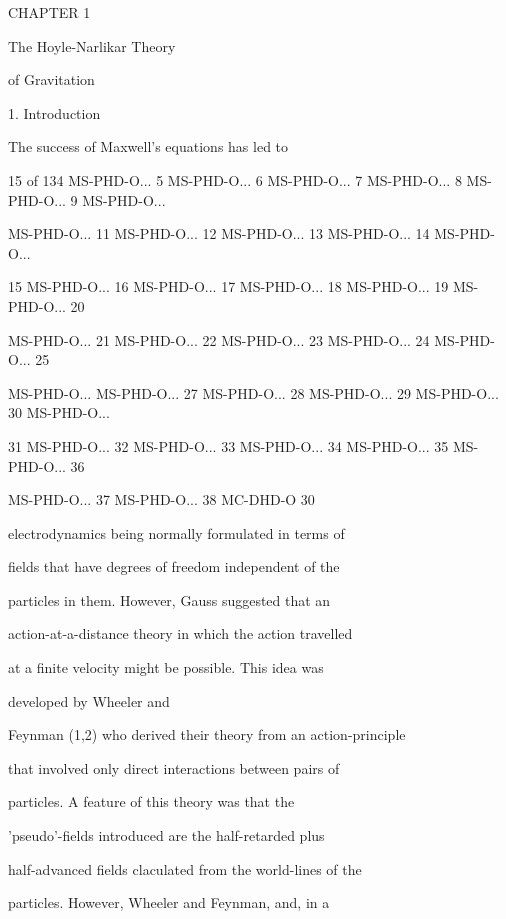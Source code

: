 \documentclass{article}
\begin{document}







CHAPTER 1

The Hoyle-Narlikar Theory

of Gravitation

1. Introduction

The success of Maxwell's equations has led to

15 of 134 MS-PHD-O... 5 MS-PHD-O... 6 MS-PHD-O... 7 MS-PHD-O... 8 MS-PHD-O... 9 MS-PHD-O...

MS-PHD-O... 11 MS-PHD-O... 12 MS-PHD-O... 13 MS-PHD-O... 14 MS-PHD-O...

15 MS-PHD-O... 16 MS-PHD-O... 17 MS-PHD-O... 18 MS-PHD-O... 19 MS-PHD-O... 20

MS-PHD-O... 21 MS-PHD-O... 22 MS-PHD-O... 23 MS-PHD-O... 24 MS-PHD-O... 25

MS-PHD-O... MS-PHD-O... 27 MS-PHD-O... 28 MS-PHD-O... 29 MS-PHD-O... 30 MS-PHD-O...

31 MS-PHD-O... 32 MS-PHD-O... 33 MS-PHD-O... 34 MS-PHD-O... 35 MS-PHD-O... 36

MS-PHD-O... 37 MS-PHD-O... 38 MC-DHD-O 30

electrodynamics being normally formulated in terms of

fields that have degrees of freedom independent of the

particles in them. However, Gauss suggested that an

action-at-a-distance theory in which the action travelled

at a finite velocity might be possible. This idea was

developed by Wheeler and

Feynman (1,2) who derived their theory from an action-principle

that involved only direct interactions between pairs of

particles. A feature of this theory was that the

'pseudo'-fields introduced are the half-retarded plus

half-advanced fields claculated from the world-lines of the

particles. However, Wheeler and Feynman, and, in a
\end{document}
